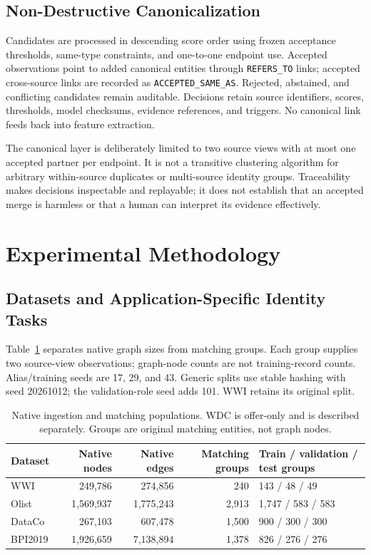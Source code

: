 \documentclass[conference,letterpaper]{IEEEtran}
\begin{document}
\subsection{Non-Destructive Canonicalization}
Candidates are processed in descending score order using frozen acceptance thresholds, same-type constraints, and one-to-one endpoint use. Accepted observations point to added canonical entities through \texttt{REFERS\_TO} links; accepted cross-source links are recorded as \texttt{ACCEPTED\_SAME\_AS}. Rejected, abstained, and conflicting candidates remain auditable. Decisions retain source identifiers, scores, thresholds, model checksums, evidence references, and triggers. No canonical link feeds back into feature extraction.

The canonical layer is deliberately limited to two source views with at most one accepted partner per endpoint. It is not a transitive clustering algorithm for arbitrary within-source duplicates or multi-source identity groups. Traceability makes decisions inspectable and replayable; it does not establish that an accepted merge is harmless or that a human can interpret its evidence effectively.

\section{Experimental Methodology}
\label{sec:methods}
\subsection{Datasets and Application-Specific Identity Tasks}
Table~\ref{tab:datasets} separates native graph sizes from matching groups. Each group supplies two source-view observations; graph-node counts are not training-record counts. Alias/training seeds are 17, 29, and 43. Generic splits use stable hashing with seed 20261012; the validation-role seed adds 101. WWI retains its original split.

\begin{table}[t]
\caption{Native ingestion and matching populations. WDC is offer-only and is described separately. Groups are original matching entities, not graph nodes.}
\label{tab:datasets}
\centering
\begin{tabular}{lrrrl}
\toprule
Dataset & Native nodes & Native edges & Matching groups & Train / validation / test groups\\
\midrule
WWI & 249,786 & 274,856 & 240 & 143 / 48 / 49\\
Olist & 1,569,937 & 1,775,243 & 2,913 & 1,747 / 583 / 583\\
DataCo & 267,103 & 607,478 & 1,500 & 900 / 300 / 300\\
BPI2019 & 1,926,659 & 7,138,894 & 1,378 & 826 / 276 / 276\\
\bottomrule
\end{tabular}
\end{table}
\end{document}
